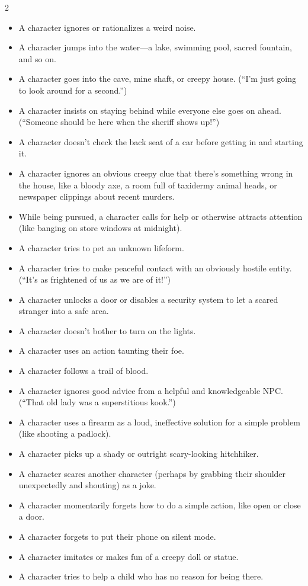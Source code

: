 \begin{multicols}{2}
\begin{itemize}
\item A character ignores or rationalizes a weird noise. 
\item A character jumps into the water—a lake, swimming pool, sacred fountain, and so on.
\item A character goes into the cave, mine shaft, or creepy house. (“I’m just going to look around for a second.”)
\item A character insists on staying behind while everyone else goes on ahead. (“Someone should be here when the sheriff shows up!”)
\item A character doesn’t check the back seat of a car before getting in and starting it.
\item A character ignores an obvious creepy clue that there’s something wrong in the house, like a bloody axe, a room full of taxidermy animal heads, or newspaper clippings about recent murders.
\item While being pursued, a character calls for help or otherwise attracts attention (like banging on store windows at midnight).
\item A character tries to pet an unknown lifeform.
\item A character tries to make peaceful contact with an obviously hostile entity. (“It’s as frightened of us as we are of it!”)
\item A character unlocks a door or disables a security system to let a scared stranger into a safe area. 
\item A character doesn’t bother to turn on the lights. 
\item A character uses an action taunting their foe.
\item A character follows a trail of blood.
\item A character ignores good advice from a helpful and knowledgeable NPC. (“That old lady was a superstitious kook.”)
\item A character uses a firearm as a loud, ineffective solution for a simple problem (like shooting a padlock).
\item A character picks up a shady or outright scary-looking hitchhiker.
\item A character scares another character (perhaps by grabbing their shoulder unexpectedly and shouting) as a joke.
\item A character momentarily forgets how to do a simple action, like open or close a door.
\item A character forgets to put their phone on silent mode. 
\item A character imitates or makes fun of a creepy doll or statue.
\item A character tries to help a child who has no reason for being there.
\end{itemize}


\end{multicols}
